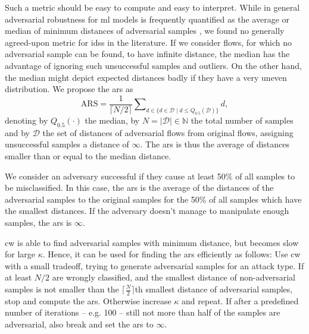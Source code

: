 \documentclass[conference]{IEEEtran}
\begin{document}
Such a metric should be easy to compute and easy to interpret.
While in general adversarial robustness for \gls{ml} models is frequently quantified as the average or median of minimum distances of adversarial samples \cite{carlini_evaluating_2019}, we found no generally agreed-upon metric for \glspl{ids} in the literature. If we consider flows, for which no adversarial sample can be found, to have infinite distance, the median has the advantage of ignoring such unsuccessful samples and outliers. On the other hand, the median might depict expected distances badly if they have a very uneven distribution. 
We propose the \gls{ars} as 
\begin{equation}
\text{ARS} = \frac{1}{\lceil N/2 \rceil} \sum\nolimits_{d \in \{d \in \mathcal D \mid d \leq Q_{0.5}(\mathcal D)\}} d,
\end{equation}
denoting by $Q_{0.5}(\cdot)$ the median, by $N = | \mathcal D | \in \mathbb N$ the total number of samples and by $\mathcal D$ the set of distances of adversarial flows from original flows, assigning unsuccessful samples a distance of $\infty$. 
The \gls{ars} is thus the average of distances smaller than or equal to the median distance.

We consider an adversary successful if they cause at least 50\% of all samples to be misclassified. In this case, the \gls{ars} is the average of the distances of the adversarial samples to the original samples for the 50\% of all samples which have the smallest distances. If the adversary doesn't manage to manipulate enough samples, the \gls{ars} is $\infty$.

\gls{cw} is able to find adversarial samples with minimum distance, but becomes slow for large $\kappa$. Hence, it can be used for finding the \gls{ars} efficiently as follows: 
Use \gls{cw} with a small tradeoff, trying to generate adversarial samples for an attack type. If %
 at least $N/2$  are wrongly classified, and
 the smallest distance of non-adversarial samples is not smaller than the $\lceil\frac{N}{2}\rceil$th smallest distance of adversarial samples,
stop and compute the \gls{ars}. Otherwise increase $\kappa$ and repeat. If after a predefined number of iterations -- e.g. 100 -- still not more than half of the samples are adversarial, also break and set the \gls{ars} to $\infty$.
\end{document}
